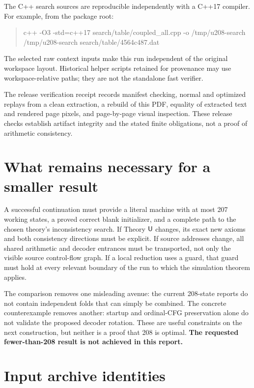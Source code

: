 \documentclass[11pt,letterpaper]{article}
\begin{document}
The C++ search sources are reproducible independently with a C++17 compiler.
For example, from the package root:
\begin{quote}\ttfamily
c++ -O3 -std=c++17 search/table/coupled\_all.cpp -o /tmp/u208-search\\
/tmp/u208-search search/table/4564c487.dat
\end{quote}
The selected raw context inputs make this run independent of the original
workspace layout. Historical helper scripts retained for provenance may use
workspace-relative paths; they are not the standalone fast verifier.

The release verification receipt records manifest checking, normal and
optimized replays from a clean extraction, a rebuild of this PDF, equality of
extracted text and rendered page pixels, and page-by-page visual inspection.
These release checks establish artifact integrity and the stated finite
obligations, not a proof of arithmetic consistency.

\section{What remains necessary for a smaller result}
A successful continuation must provide a literal machine with at most 207
working states, a proved correct blank initializer, and a complete path to the
chosen theory's inconsistency search. If Theory $\mathsf U$ changes, its exact new
axioms and both consistency directions must be explicit. If source addresses
change, all shared arithmetic and decoder entrances must be transported, not
only the visible source control-flow graph. If a local reduction uses a guard,
that guard must hold at every relevant boundary of the run to which the
simulation theorem applies.

The comparison removes one misleading avenue: the current 208-state reports
do not contain independent folds that can simply be combined. The concrete
counterexample removes another: startup and ordinal-CFG preservation alone
do not validate the proposed decoder rotation. These are useful constraints
on the next construction, but neither is a proof that 208 is optimal.
\textbf{The requested fewer-than-208 result is not achieved in this report.}

\clearpage
\appendix
\section{Input archive identities}

\end{document}

